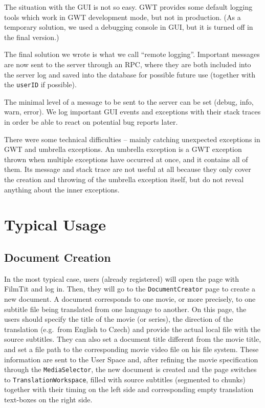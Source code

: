 The situation with the GUI is not so easy. GWT provides some default logging tools which work in GWT development mode, but not in production. (As a temporary solution, we used a debugging console in GUI, but it is turned off in the final version.)

The final solution we wrote is what we call ``remote logging''. Important messages are now sent to the server through an RPC, where they are both included into the server log and saved into the database for possible future use (together with the {\tt userID} if possible).

The minimal level of a message to be sent to the server can be set (debug, info, warn, error). We log important GUI events and exceptions with their stack traces in order be able to react on potential bug reports later.

There were some technical difficulties -- mainly catching unexpected exceptions in GWT and umbrella exceptions. An umbrella exception is a GWT exception thrown when multiple exceptions have occurred at once, and it contains all of them. Its message and stack trace are not useful at all because they only cover the creation and throwing of the umbrella exception itself, but do not reveal anything about the inner exceptions.

\section{Typical Usage}

\subsection{Document Creation}

In the most typical case, users (already registered) will open the page with FilmTit and log in. Then, they will go to the {\tt DocumentCreator} page to create a new document. A document corresponds to one movie, or more precisely, to one subtitle file being translated from one language to another. On this page, the users should specify the title of the movie (or series), the direction of the translation (e.g.\ from English to Czech) and provide the actual local file with the source subtitles. They can also set a document title different from the movie title, and set a file path to the corresponding movie video file on his file system.
These information are sent to the User Space and, after refining the movie specification through the {\tt MediaSelector}, the new document is created and the page switches to {\tt TranslationWorkspace}, filled with source subtitles (segmented to chunks) together with their timing on the left side and corresponding empty translation text-boxes on the right side.

